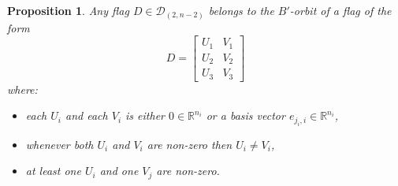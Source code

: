 \documentclass[pdftex]{sigma}
\numberwithin{equation}{section}
\newtheorem{Proposition}[Theorem]{Proposition}
\theoremstyle{definition}
\newcommand{\R}{\mathbb{R}}
\newcommand{\D}{\mathcal{D}}
\theoremstyle{plain}
\theoremstyle{plain}
\theoremstyle{plain}
\theoremstyle{plain}
\begin{document}

\begin{Proposition}{\label{orbits II1}}
	Any flag $D \in \D_{(2,n-2)}$ belongs to the $B'$-orbit of a flag of the form
	\begin{equation*}
		D = \begin{bmatrix}
	U_1 & V_1 \\
	U_2 & V_2 \\
	U_3 & V_3
\end{bmatrix}
	\end{equation*}
	where:
	\begin{itemize}[label = --]
		\item each $U_i$ and each $V_i$ is either $0 \in \R^{n_i}$ or a basis vector $e_{j_i,i} \in \R^{n_i}$,
		\item whenever both $U_i$ and $V_i$ are non-zero then $U_i \neq V_i$,
		\item at least one $U_i$ and one $V_j$ are non-zero.
	\end{itemize}
\end{Proposition}
\end{document}
